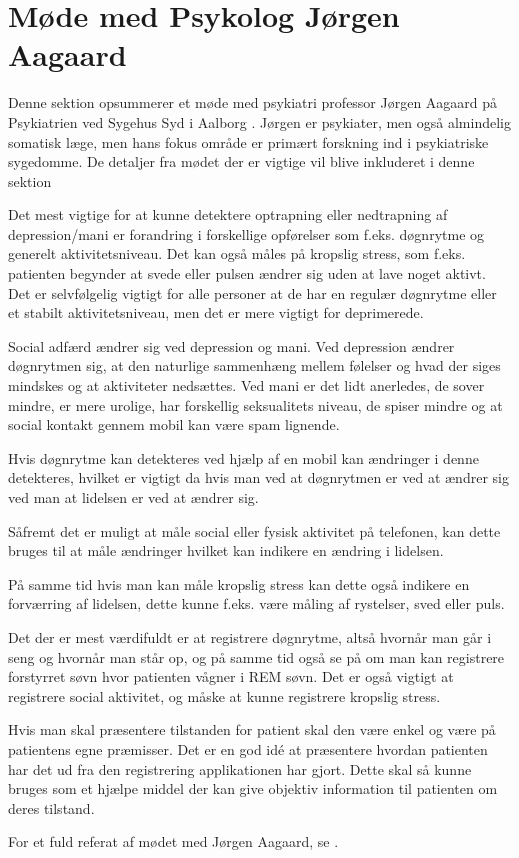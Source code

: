 \section{Møde med Psykolog Jørgen Aagaard}\label{sec:moede-med-joergen}
Denne sektion opsummerer et møde med psykiatri professor Jørgen Aagaard på Psykiatrien ved Sygehus Syd i Aalborg \citep{misc:jorgen-aagaard}. 
Jørgen er psykiater, men også almindelig somatisk læge, men hans fokus område er primært forskning ind i psykiatriske sygedomme.
De detaljer fra mødet der er vigtige vil blive inkluderet i denne sektion

Det mest vigtige for at kunne detektere optrapning eller nedtrapning af depression/mani er forandring i forskellige opførelser som f.eks. døgnrytme og generelt aktivitetsniveau. Det kan også måles på kropslig stress, som f.eks. patienten begynder at svede eller pulsen ændrer sig uden at lave noget aktivt. 
Det er selvfølgelig vigtigt for alle personer at de har en regulær døgnrytme eller et stabilt aktivitetsniveau, men det er mere vigtigt for deprimerede.

Social adfærd ændrer sig ved depression og mani.
Ved depression ændrer døgnrytmen sig, at den naturlige sammenhæng mellem følelser og hvad der siges mindskes og at aktiviteter nedsættes.
Ved mani er det lidt anerledes, de sover mindre, er mere urolige, har forskellig seksualitets niveau, de spiser mindre og at social kontakt gennem mobil kan være spam lignende. 

Hvis døgnrytme kan detekteres ved hjælp af en mobil kan ændringer i denne detekteres, hvilket er vigtigt da hvis man ved at døgnrytmen er ved at ændrer sig ved man at lidelsen er ved at ændrer sig.

Såfremt det er muligt at måle social eller fysisk aktivitet på telefonen, kan dette bruges til at måle ændringer hvilket kan indikere en ændring i lidelsen.

På samme tid hvis man kan måle kropslig stress kan dette også indikere en forværring af lidelsen, dette kunne f.eks. være måling af rystelser, sved eller puls. 

Det der er mest værdifuldt er at registrere døgnrytme, altså hvornår man går i seng og hvornår man står op, og på samme tid også se på om man kan registrere forstyrret søvn hvor patienten vågner i REM søvn. 
Det er også vigtigt at registrere social aktivitet, og måske at kunne registrere kropslig stress.

Hvis man skal præsentere tilstanden for patient skal den være enkel og være på patientens egne præmisser. Det er en god idé at præsentere hvordan patienten har det ud fra den registrering applikationen har gjort. Dette skal så kunne bruges som et hjælpe middel der kan give objektiv information til patienten om deres tilstand.

For et fuld referat af mødet med Jørgen Aagaard, se .